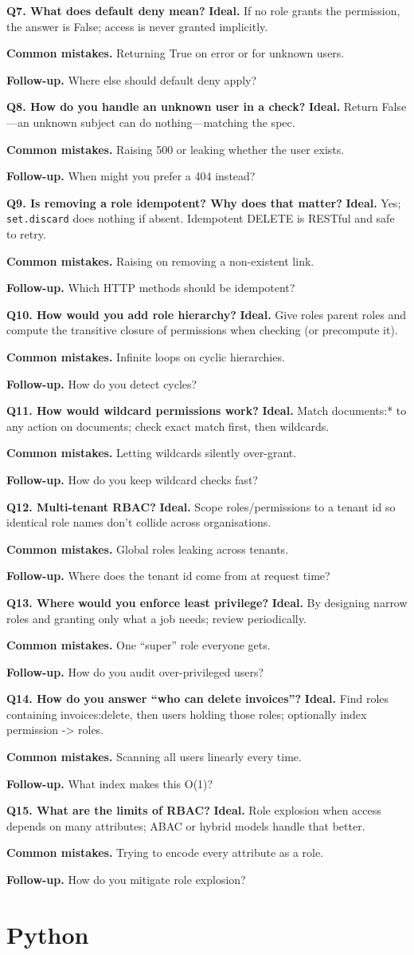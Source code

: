 \documentclass[11pt,a4paper]{report}
\newcommand{\qa}[3]{%
  \textbf{Ideal.} #1\par
  \textbf{Common mistakes.} #2\par
  \textbf{Follow-up.} #3\par
  \vspace{4pt}
}
\begin{document}
\textbf{Q7. What does default deny mean?}
\qa{If no role grants the permission, the answer is False; access is never granted
implicitly.}
{Returning True on error or for unknown users.}
{Where else should default deny apply?}

\textbf{Q8. How do you handle an unknown user in a check?}
\qa{Return False---an unknown subject can do nothing---matching the spec.}
{Raising 500 or leaking whether the user exists.}
{When might you prefer a 404 instead?}

\textbf{Q9. Is removing a role idempotent? Why does that matter?}
\qa{Yes; \texttt{set.discard} does nothing if absent. Idempotent DELETE is
RESTful and safe to retry.}
{Raising on removing a non-existent link.}
{Which HTTP methods should be idempotent?}

\textbf{Q10. How would you add role hierarchy?}
\qa{Give roles parent roles and compute the transitive closure of permissions when
checking (or precompute it).}
{Infinite loops on cyclic hierarchies.}
{How do you detect cycles?}

\textbf{Q11. How would wildcard permissions work?}
\qa{Match documents:* to any action on documents; check exact match first, then
wildcards.}
{Letting wildcards silently over-grant.}
{How do you keep wildcard checks fast?}

\textbf{Q12. Multi-tenant RBAC?}
\qa{Scope roles/permissions to a tenant id so identical role names don't collide
across organisations.}
{Global roles leaking across tenants.}
{Where does the tenant id come from at request time?}

\textbf{Q13. Where would you enforce least privilege?}
\qa{By designing narrow roles and granting only what a job needs; review
periodically.}
{One ``super'' role everyone gets.}
{How do you audit over-privileged users?}

\textbf{Q14. How do you answer ``who can delete invoices''?}
\qa{Find roles containing invoices:delete, then users holding those roles;
optionally index permission -> roles.}
{Scanning all users linearly every time.}
{What index makes this O(1)?}

\textbf{Q15. What are the limits of RBAC?}
\qa{Role explosion when access depends on many attributes; ABAC or hybrid models
handle that better.}
{Trying to encode every attribute as a role.}
{How do you mitigate role explosion?}

\section{Python}
\end{document}
